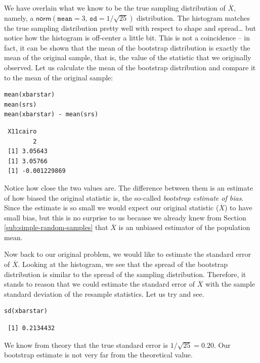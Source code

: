 \documentclass[captions=tableheading]{scrbook}
\begin{document}
\begin{example}
We have overlain what we know to be the true sampling distribution of \(\overline{X}\), namely, a \(\mathsf{norm}(\mathtt{mean}=3,\,\mathtt{sd}=1/\sqrt{25})\) distribution. The histogram matches the true sampling distribution pretty well with respect to shape and spread\ldots{} but notice how the histogram is off-center a little bit. This is not a coincidence -- in fact, it can be shown that the mean of the bootstrap distribution is exactly the mean of the original sample, that is, the value of the statistic that we originally observed. Let us calculate the mean of the bootstrap distribution and compare it to the mean of the original sample:


\begin{verbatim}
mean(xbarstar)
mean(srs)
mean(xbarstar) - mean(srs)
\end{verbatim}

\begin{verbatim}
 X11cairo 
        2
 [1] 3.05643
 [1] 3.05766
 [1] -0.001229869
\end{verbatim}

\end{example}

Notice how close the two values are. The difference between them is an estimate of how biased the original statistic is, the so-called \emph{bootstrap estimate of bias}. Since the estimate is so small we would expect our original statistic (\(\overline{X}\)) to have small bias, but this is no surprise to us because we already knew from Section \ref{sub:simple-random-samples} that \(\overline{X}\) is an unbiased estimator of the population mean.

Now back to our original problem, we would like to estimate the standard error of \(\overline{X}\). Looking at the histogram, we see that the spread of the bootstrap distribution is similar to the spread of the sampling distribution. Therefore, it stands to reason that we could estimate the standard error of \(\overline{X}\) with the sample standard deviation of the resample statistics. Let us try and see.


\begin{verbatim}
sd(xbarstar)
\end{verbatim}

\begin{verbatim}
 [1] 0.2134432
\end{verbatim}

We know from theory that the true standard error is \(1/\sqrt{25}=0.20\). Our bootstrap estimate is not very far from the theoretical value. 
\end{document}

